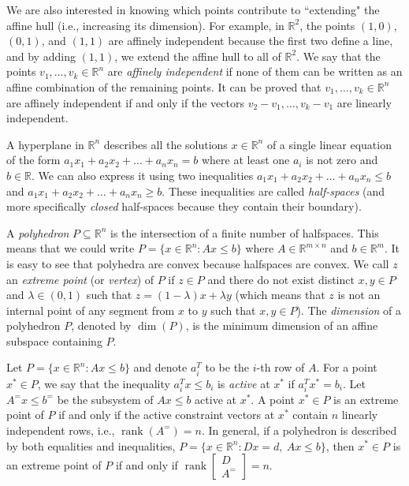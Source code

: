\documentclass[12pt]{report}
\numberwithin{algorithm}{chapter}
\begin{document}
	We are also interested in knowing which points contribute to  ``extending" the affine hull (i.e., increasing its dimension). For example, in $\mathbb{R}^{2}$, the points $(1, 0)$, $(0, 1)$, and $(1, 1)$ are affinely independent because the first two define a line, and by adding $(1, 1)$, we extend the affine hull to all of $\mathbb{R}^{2}$. We say that the points $v_{1}, \ldots, v_{k} \in \mathbb{R}^{n}$ are \emph{affinely independent} if none of them can be written as an affine combination of the remaining points. It can be proved that $v_{1}, \ldots, v_{k} \in \mathbb{R}^{n}$ are affinely independent if and only if the vectors $v_{2} - v_{1}, \ldots, v_{k} - v_{1}$ are linearly independent.
	
	A hyperplane in $\mathbb{R}^{n}$ describes all the solutions $x \in \mathbb{R}^{n}$ of a single linear equation of the form $a_{1}x_{1} + a_{2}x_{2} + \ldots + a_{n}x_{n} = b$ where at least one $a_{i}$ is not zero and $b \in \mathbb{R}$. We can also express it using two inequalities $a_{1}x_{1} + a_{2}x_{2} + \ldots + a_{n}x_{n} \leq b$ and $a_{1}x_{1} + a_{2}x_{2} + \ldots + a_{n}x_{n} \geq b$. These inequalities are called \emph{half-spaces} (and more specifically \emph{closed} half-spaces because they contain their boundary). 
	
	A \emph{polyhedron} $P \subseteq \mathbb{R}^{n}$ is the intersection of a finite number of halfspaces. This means that we could write $P = \{x \in \mathbb{R}^{n} : Ax \leq b\}$ where $A \in \mathbb{R}^{m \times n}$ and $b \in \mathbb{R}^{m}$. It is easy to see that polyhedra are convex because halfspaces are convex. We call $z$ an \emph{extreme point} (or \emph{vertex}) of $P$ if $z \in P$ and there do not exist distinct $x,y \in P$ and $\lambda \in (0,1)$ such that $z = (1 - \lambda)x + \lambda y$ (which means that $z$ is not an internal point of any segment from $x$ to $y$ such that $x,y \in P$). The \emph{dimension} of a polyhedron $P$, denoted by $\operatorname{dim}(P)$, is the minimum dimension of an affine subspace containing $P$.
	
	Let $P = \{x \in \mathbb{R}^{n} : Ax \leq b\}$ and denote $a_i^T$ to be the $i$-th row of $A$. For a point $x^{*} \in P$, we say that the inequality $a_i^Tx \leq b_i$ is \emph{active} at $x^{*}$ if $a_i^Tx^{*} = b_i$. Let $A^{=}x \leq b^{=}$ be the subsystem of $Ax \leq b$ active at $x^{*}$. A point $x^{*} \in P$ is an extreme point of $P$ if and only if the active constraint vectors at $x^{*}$ contain $n$ linearly independent rows, i.e., $\operatorname{rank}(A^{=}) = n. $
	In general, if a polyhedron is described by both equalities and inequalities,
	$ P = \{x \in \mathbb{R}^{n} : Dx = d,\ Ax \leq b\}$, then $x^{*} \in P$ is an extreme point of $P$ if and only if
	$
	\operatorname{rank}
	\begin{bmatrix}
		D \\
		A^{=}
	\end{bmatrix}
	= n
	$.
	
\end{document}
